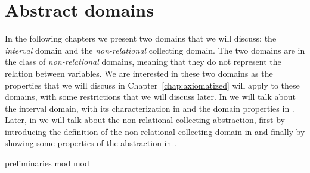 \chapter{Abstract domains}\label{chap:abstractdomains}


In the following chapters we present two domains that we will discuss:
the \emph{interval} domain and the \emph{non-relational} collecting
domain. The two domains are in the class of \emph{non-relational}
domains, meaning that they do not represent the relation between
variables. We are interested in these two domains as the properties
that we will discuss in Chapter~\ref{chap:axiomatized} will apply to
these domains, with some restrictions that we will discuss later. In
 we will talk about the interval domain, with
its characterization in  and the domain
properties in .  Later, in
 we will talk about the non-relational
collecting abstraction, first by introducing the definition of the
non-relational collecting domain in  and finally by
showing some properties of the abstraction in .

{preliminaries}
{mod}
{mod}

